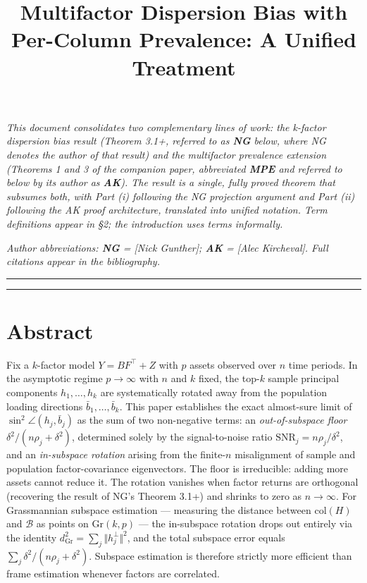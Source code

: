 \documentclass{article}
\title{Multifactor Dispersion Bias with Per-Column Prevalence: A Unified Treatment}
\author{}
\date{}
\theoremstyle{remark}
\begin{document}
\maketitle


\textit{This document consolidates two complementary lines of work: the k-factor dispersion bias result (Theorem 3.1+, referred to as \textbf{NG} below, where NG denotes the author of that result) and the multifactor prevalence extension (Theorems 1 and 3 of the companion paper, abbreviated \textbf{MPE} and referred to below by its author as \textbf{AK}). The result is a single, fully proved theorem that subsumes both, with Part (i) following the NG projection argument and Part (ii) following the AK proof architecture, translated into unified notation. Term definitions appear in §2; the introduction uses terms informally.}

\textit{Author abbreviations: \textbf{NG} = [Nick Gunther]; \textbf{AK} = [Alec Kircheval]. Full citations appear in the bibliography.}

\medskip\noindent\rule{\linewidth}{0.4pt}\medskip

\tableofcontents

\medskip\noindent\rule{\linewidth}{0.4pt}\medskip

\section{Abstract}

Fix a $k$-factor model $Y = BF^\top + Z$ with $p$ assets observed over $n$ time periods. In the asymptotic regime $p \to \infty$ with $n$ and $k$ fixed, the top-$k$ sample principal components $h_1, \ldots, h_k$ are systematically rotated away from the population loading directions $\bar{b}_1, \ldots, \bar{b}_k$. This paper establishes the exact almost-sure limit of $\sin^2\angle(h_j, \bar{b}_j)$ as the sum of two non-negative terms: an \textit{out-of-subspace floor} $\delta^2/(n\rho_j + \delta^2)$, determined solely by the signal-to-noise ratio $\mathrm{SNR}_j = n\rho_j/\delta^2$, and an \textit{in-subspace rotation} arising from the finite-$n$ misalignment of sample and population factor-covariance eigenvectors. The floor is irreducible: adding more assets cannot reduce it. The rotation vanishes when factor returns are orthogonal (recovering the result of NG's Theorem 3.1+) and shrinks to zero as $n \to \infty$. For Grassmannian subspace estimation — measuring the distance between $\mathrm{col}(H)$ and $\mathcal{B}$ as points on $\mathrm{Gr}(k,p)$ — the in-subspace rotation drops out entirely via the identity $d_{\mathrm{Gr}}^2 = \sum_j \Vert h_j^\perp\Vert^2$, and the total subspace error equals $\sum_j \delta^2/(n\rho_j + \delta^2)$. Subspace estimation is therefore strictly more efficient than frame estimation whenever factors are correlated.
\end{document}
